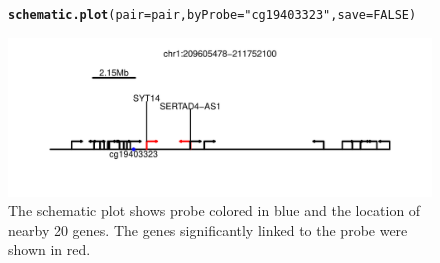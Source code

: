 \documentclass{article}\usepackage[]{graphicx}\usepackage[usenames,dvipsnames]{color}
\makeatletter
\def\maxwidth{ %
  \ifdim\Gin@nat@width>\linewidth
    \linewidth
  \else
    \Gin@nat@width
  \fi
}
\newcommand{\hlnum}[1]{\textcolor[rgb]{0.686,0.059,0.569}{#1}}%
\newcommand{\hlstr}[1]{\textcolor[rgb]{0.192,0.494,0.8}{#1}}%
\newcommand{\hlstd}[1]{\textcolor[rgb]{0.345,0.345,0.345}{#1}}%
\newcommand{\hlkwc}[1]{\textcolor[rgb]{0.333,0.667,0.333}{#1}}%
\newcommand{\hlkwd}[1]{\textcolor[rgb]{0.737,0.353,0.396}{\textbf{#1}}}%
\newenvironment{kframe}{%
 \def\at@end@of@kframe{}%
 \ifinner\ifhmode%
  \def\at@end@of@kframe{\end{minipage}}%
  \begin{minipage}{\columnwidth}%
 \fi\fi%
 \def\FrameCommand##1{\hskip\@totalleftmargin \hskip-\fboxsep
 \colorbox{shadecolor}{##1}\hskip-\fboxsep
     \hskip-\linewidth \hskip-\@totalleftmargin \hskip\columnwidth}%
 \MakeFramed {\advance\hsize-\width
   \@totalleftmargin\z@ \linewidth\hsize
   \@setminipage}}%
 {\par\unskip\endMakeFramed%
 \at@end@of@kframe}
\newenvironment{knitrout}{}{} %
\makeatother
\begin{document}
\begin{figure}[H]
\begin{knitrout}
\color{fgcolor}\begin{kframe}
\begin{alltt}
\hlkwd{schematic.plot}\hlstd{(}\hlkwc{pair}\hlstd{=pair,} \hlkwc{byProbe}\hlstd{=}\hlstr{"cg19403323"}\hlstd{,}\hlkwc{save}\hlstd{=}\hlnum{FALSE}\hlstd{)}
\end{alltt}


{\ttfamily\noindent\itshape\color{messagecolor}{\#\# cg19403323}}\end{kframe}

{\centering \includegraphics[width=\maxwidth]{figure/figure4-1} 

}



\end{knitrout}
\protect\caption{The schematic plot shows probe colored 
in blue and the location of nearby 20 genes. The genes significantly linked to the probe 
were shown in red.
\label{fig:figure4}}
\end{figure}
\end{document}
